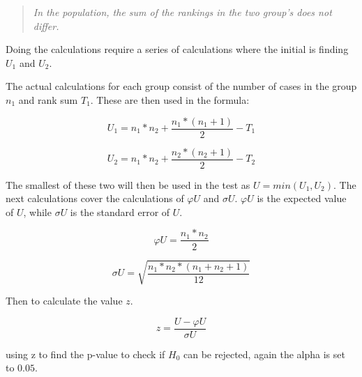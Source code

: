 \begin{quote}
    \textit{In the population, the sum of the rankings in the two group's does not differ.}
\end{quote}

Doing the calculations require a series of calculations where the initial is finding $U_1$ and $U_2$.

The actual calculations for each group consist of the number of cases in the group $n_1$ and rank sum $T_1$. These are then used in the formula:

\begin{equation}
    U_1 = n_1*n_2+\frac{n_1*(n_1+1)}{2}-T_1  
\end{equation}

\begin{equation}
    U_2 = n_1*n_2+\frac{n_2*(n_2+1)}{2}-T_2
\end{equation}

The smallest of these two will then be used in the test as $U=min(U_1,U_2)$. The next calculations cover the calculations of $\varphi U$ and $\sigma U$. $\varphi U$ is the expected value of $U$, while $\sigma U$ is the standard error of $U$.

\begin{equation}
    \varphi U = \frac{n_1*n_2}{2}
\end{equation}

\begin{equation}
    \sigma U = \sqrt{\frac{n_1*n_2*(n_1+n_2+1)}{12}}
\end{equation}

Then to calculate the value $z$.

\begin{equation}
    z = \frac{U-\varphi U}{\sigma U}
\end{equation}

using z to find the p-value to check if $H_0$ can be rejected, again the alpha is set to $0.05$. 

